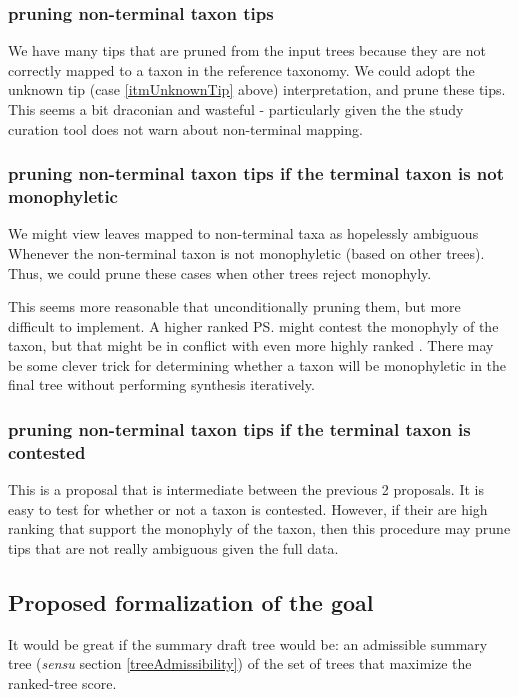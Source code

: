 \documentclass[11pt]{article}
\begin{document}
\subsubsection{pruning non-terminal taxon tips}
We have many tips that are pruned from the input trees because they are 
    not correctly mapped to a taxon in the reference taxonomy.
We could adopt the unknown tip (case \ref{itmUnknownTip} above) interpretation,
    and prune these tips.
This seems a bit draconian and wasteful - particularly given the the study
    curation tool does not warn about non-terminal mapping.

\subsubsection{pruning non-terminal taxon tips if the terminal taxon is not monophyletic}
We might view leaves mapped to non-terminal taxa as hopelessly ambiguous Whenever the non-terminal
    taxon is not monophyletic (based on other trees).
Thus, we could prune these cases when other trees reject monophyly.

This seems more reasonable that unconditionally pruning them, but more difficult to implement.
A higher ranked \ps might contest the monophyly of the taxon, but that \pss might be 
    in conflict with even more highly ranked \pss.
There may be some clever trick for determining whether a taxon will be monophyletic in the
    final tree without performing synthesis iteratively.

\subsubsection{pruning non-terminal taxon tips if the terminal taxon is contested}
This is a proposal that is intermediate between the previous 2 proposals.
It is easy to test for whether or not a taxon is contested.
However, if their are high ranking \pss that support the monophyly of the taxon,
    then this procedure may prune tips that are not really ambiguous given 
    the full data.

\subsection{Proposed formalization of the goal}
It would be great if the summary draft tree would be:
    an admissible summary tree ({\em sensu} section \ref{treeAdmissibility}) of the set of trees
    that maximize the ranked-tree \SWIPSD score.
\end{document}

